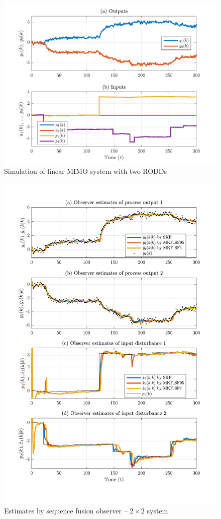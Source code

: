 \begin{figure}[htp]
	\centering
	\includegraphics[width=13cm]{images/rod_obs_sim2_all_seed_ioplot.pdf}
	\caption{Simulation of linear MIMO system with two \gls{RODD}s}
	\label{fig:rod-obs-sim-2-ioplot}
\end{figure}

\begin{figure}[htp]
	\centering
	\includegraphics[width=13cm]{images/rod_obs_sim2_all_seed_y_est1_SF1.pdf}
	\caption{Estimates by sequence fusion observer –  $2\times2$ system}
	\label{fig:rod-obs-sim2-yest-1-SF}
\end{figure}

